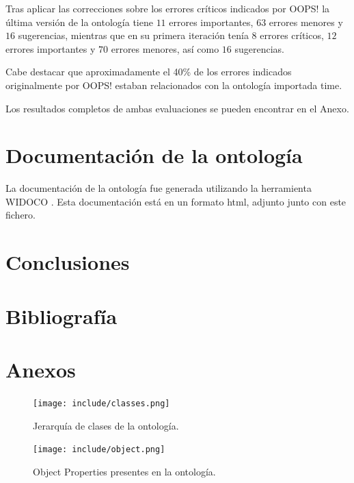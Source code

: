 \documentclass[a4paper,12pt]{article}
\begin{document}
	Tras aplicar las correcciones sobre los errores críticos indicados por OOPS! la última versión de la ontología tiene $11$ errores importantes, $63$ errores menores y $16$ sugerencias, mientras que en su primera iteración tenía $8$ errores críticos, $12$ errores importantes y $70$ errores menores, así como $16$ sugerencias.
	
	Cabe destacar que aproximadamente el 40\% de los errores indicados originalmente por OOPS! estaban relacionados con la ontología importada time.
	
	Los resultados completos de ambas evaluaciones se pueden encontrar en el Anexo.
	
	\section{Documentación de la ontología}
	La documentación de la ontología fue generada utilizando la herramienta WIDOCO \cite{widoco}. Esta documentación está en un formato html, adjunto junto con este fichero.
	
	
	\section{Conclusiones}
	
	
	
	
\newpage
	\section*{Bibliografía}
	
	
	
	\newpage
	\section*{Anexos}
	
	\begin{figure}[H]
		\centering
		\texttt{[image: include/classes.png]}
		\caption{Jerarquía de clases de la ontología.}
	\end{figure}

	\begin{figure}[H]
		\centering
		\texttt{[image: include/object.png]}
		\caption{Object Properties presentes en la ontología.}
	\end{figure}
	
\end{document}
